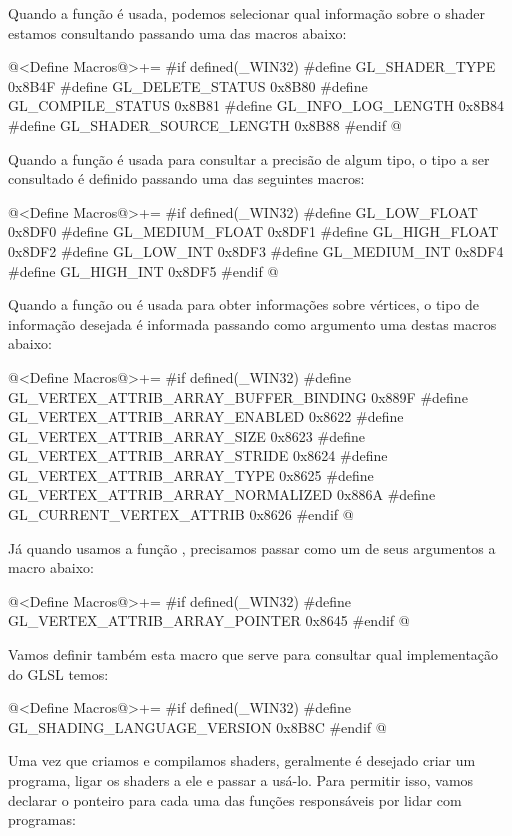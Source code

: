 Quando a função  é usada, podemos selecionar
qual informação sobre o shader estamos consultando passando uma das
macros abaixo:

\iniciocodigo
@<Define Macros@>+=
#if defined(_WIN32)
#define GL_SHADER_TYPE          0x8B4F
#define GL_DELETE_STATUS        0x8B80
#define GL_COMPILE_STATUS       0x8B81
#define GL_INFO_LOG_LENGTH      0x8B84
#define GL_SHADER_SOURCE_LENGTH 0x8B88
#endif
@
\fimcodigo

Quando a função  é usada para
consultar a precisão de algum tipo, o tipo a ser consultado é definido
passando uma das seguintes macros:

\iniciocodigo
@<Define Macros@>+=
#if defined(_WIN32)
#define GL_LOW_FLOAT    0x8DF0
#define GL_MEDIUM_FLOAT 0x8DF1
#define GL_HIGH_FLOAT   0x8DF2
#define GL_LOW_INT      0x8DF3
#define GL_MEDIUM_INT   0x8DF4
#define GL_HIGH_INT     0x8DF5
#endif
@
\fimcodigo

Quando a função 
ou  é usada para obter informações
sobre vértices, o tipo de informação desejada é informada passando
como argumento uma destas macros abaixo:

\iniciocodigo
@<Define Macros@>+=
#if defined(_WIN32)
#define GL_VERTEX_ATTRIB_ARRAY_BUFFER_BINDING 0x889F
#define GL_VERTEX_ATTRIB_ARRAY_ENABLED        0x8622
#define GL_VERTEX_ATTRIB_ARRAY_SIZE           0x8623
#define GL_VERTEX_ATTRIB_ARRAY_STRIDE         0x8624
#define GL_VERTEX_ATTRIB_ARRAY_TYPE           0x8625
#define GL_VERTEX_ATTRIB_ARRAY_NORMALIZED     0x886A
#define GL_CURRENT_VERTEX_ATTRIB              0x8626
#endif
@
\fimcodigo

Já quando usamos a função ,
precisamos passar como um de seus argumentos a macro abaixo:

\iniciocodigo
@<Define Macros@>+=
#if defined(_WIN32)
#define GL_VERTEX_ATTRIB_ARRAY_POINTER 0x8645
#endif
@
\fimcodigo

Vamos definir também esta macro que serve para consultar qual
implementação do GLSL temos:

\iniciocodigo
@<Define Macros@>+=
#if defined(_WIN32)
#define GL_SHADING_LANGUAGE_VERSION 0x8B8C
#endif
@
\fimcodigo

Uma vez que criamos e compilamos shaders, geralmente é desejado criar
um programa, ligar os shaders a ele e passar a usá-lo. Para permitir
isso, vamos declarar o ponteiro para cada uma das funções responsáveis
por lidar com programas:

